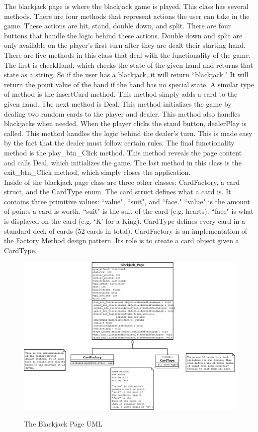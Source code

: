 \documentclass[10pt,conference,onecolumn,compsoc]{IEEEtran}
\begin{document}
\newline
The blackjack page is where the blackjack game is played. This class has several methods. There are four methods that represent actions the user can take in the game. These actions are hit, stand, double down, and split. There are four buttons that handle the logic behind these actions. Double down and split are only available on the player's first turn after they are dealt their starting hand. There are five methods in this class that deal with the functionality of the game. The first is checkHand, which checks the state of the given hand and returns that state as a string. So if the user has a blackjack, it will return ``blackjack." It will return the point value of the hand if the hand has no special state. A similar type of method is the insertCard method. This method simply adds a card to the given hand. The next method is Deal. This method initializes the game by dealing two random cards to the player and dealer. This method also handles blackjacks when needed. When the player clicks the stand button, dealerPlay is called. This method handles the logic behind the dealer's turn. This is made easy by the fact that the dealer must follow certain rules. The final functionality method is the play\_btn\_Click method. This method reveals the page content and calls Deal, which initializes the game. The last method in this class is the exit\_btn\_Click method, which simply closes the application.\\
\newline
Inside of the blackjack page class are three other classes: CardFactory, a card struct, and the CardType enum. The card struct defines what a card is. It contains three primitive values: ``value", ``suit", and ``face." ``value" is the amount of points a card is worth. ``suit" is the suit of the card (e.g. hearts). ``face" is what is displayed on the card (e.g. `K' for a King). CardType defines every card in a standard deck of cards (52 cards in total). CardFactory is an implementation of the Factory Method design pattern. Its role is to create a card object given a CardType.

\begin{figure}[h]
\caption{The Blackjack Page UML}
\centering
\includegraphics[scale=0.45]{Blackjack_UML}
\label{fig:outline1}
\centering
\end{figure}
\end{document}
